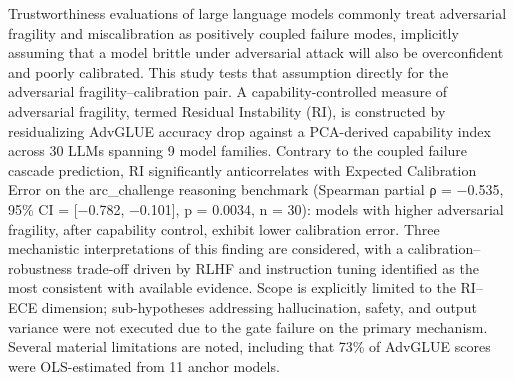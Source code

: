 
Trustworthiness evaluations of large language models commonly treat adversarial fragility and miscalibration as positively coupled failure modes, implicitly assuming that a model brittle under adversarial attack will also be overconfident and poorly calibrated. This study tests that assumption directly for the adversarial fragility–calibration pair. A capability-controlled measure of adversarial fragility, termed Residual Instability (RI), is constructed by residualizing AdvGLUE accuracy drop against a PCA-derived capability index across 30 LLMs spanning 9 model families. Contrary to the coupled failure cascade prediction, RI significantly anticorrelates with Expected Calibration Error on the arc_challenge reasoning benchmark (Spearman partial ρ = −0.535, 95\% CI = [−0.782, −0.101], p = 0.0034, n = 30): models with higher adversarial fragility, after capability control, exhibit lower calibration error. Three mechanistic interpretations of this finding are considered, with a calibration–robustness trade-off driven by RLHF and instruction tuning identified as the most consistent with available evidence. Scope is explicitly limited to the RI–ECE dimension; sub-hypotheses addressing hallucination, safety, and output variance were not executed due to the gate failure on the primary mechanism. Several material limitations are noted, including that 73\% of AdvGLUE scores were OLS-estimated from 11 anchor models.

